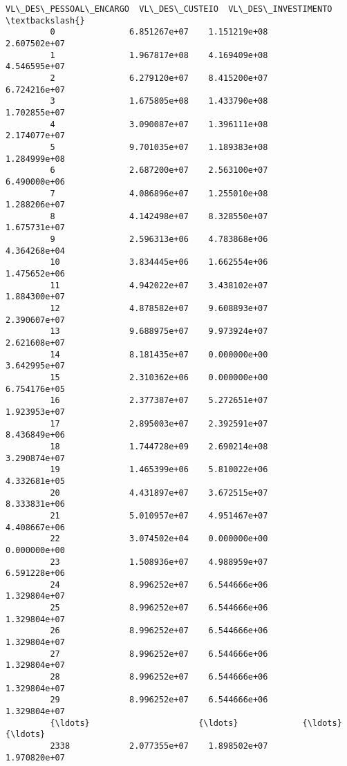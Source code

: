 \documentclass[11pt]{article}
\begin{document}
\begin{Verbatim}[commandchars=\\\{\}]
               VL\_DES\_PESSOAL\_ENCARGO  VL\_DES\_CUSTEIO  VL\_DES\_INVESTIMENTO  \textbackslash{}
         0               6.851267e+07    1.151219e+08         2.607502e+07   
         1               1.967817e+08    4.169409e+08         4.546595e+07   
         2               6.279120e+07    8.415200e+07         6.724216e+07   
         3               1.675805e+08    1.433790e+08         1.702855e+07   
         4               3.090087e+07    1.396111e+08         2.174077e+07   
         5               9.701035e+07    1.189383e+08         1.284999e+08   
         6               2.687200e+07    2.563100e+07         6.490000e+06   
         7               4.086896e+07    1.255010e+08         1.288206e+07   
         8               4.142498e+07    8.328550e+07         1.675731e+07   
         9               2.596313e+06    4.783868e+06         4.364268e+04   
         10              3.834445e+06    1.662554e+06         1.475652e+06   
         11              4.942022e+07    3.438102e+07         1.884300e+07   
         12              4.878582e+07    9.608893e+07         2.390607e+07   
         13              9.688975e+07    9.973924e+07         2.621608e+07   
         14              8.181435e+07    0.000000e+00         3.642995e+07   
         15              2.310362e+06    0.000000e+00         6.754176e+05   
         16              2.377387e+07    5.272651e+07         1.923953e+07   
         17              2.895003e+07    2.392591e+07         8.436849e+06   
         18              1.744728e+09    2.690214e+08         3.290874e+07   
         19              1.465399e+06    5.810022e+06         4.332681e+05   
         20              4.431897e+07    3.672515e+07         8.333831e+06   
         21              5.010957e+07    4.951467e+07         4.408667e+06   
         22              3.074502e+04    0.000000e+00         0.000000e+00   
         23              1.508936e+07    4.988959e+07         6.591228e+06   
         24              8.996252e+07    6.544666e+06         1.329804e+07   
         25              8.996252e+07    6.544666e+06         1.329804e+07   
         26              8.996252e+07    6.544666e+06         1.329804e+07   
         27              8.996252e+07    6.544666e+06         1.329804e+07   
         28              8.996252e+07    6.544666e+06         1.329804e+07   
         29              8.996252e+07    6.544666e+06         1.329804e+07   
         {\ldots}                      {\ldots}             {\ldots}                  {\ldots}   
         2338            2.077355e+07    1.898502e+07         1.970820e+07   

\end{Verbatim}
\end{document}
